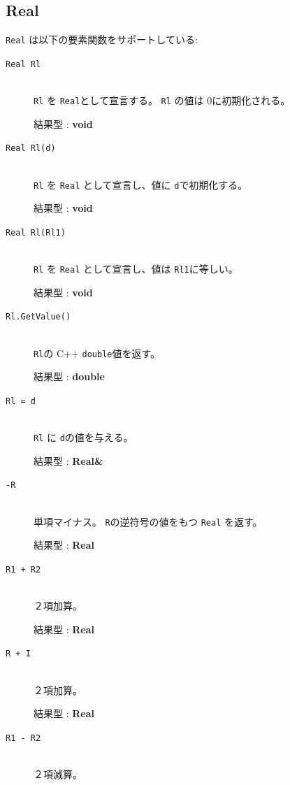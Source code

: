\documentclass[\pformat,12pt]{jarticle}
\begin{document}
\subsection{Real}
{\tt Real} は以下の要素関数をサポートしている:

\vspace{0.5cm}

\begin{description}
\item[{\tt Real Rl}] \mbox{}\\
     {\tt Rl} を {\tt Real}として宣言する。 
{\tt Rl} の値は 0に初期化される。

     結果型 : {\bf void}

\item[{\tt Real Rl(d)}] \mbox{}\\
      {\tt Rl} を {\tt Real} として宣言し、値に {\tt d}で初期化する。

     結果型 : {\bf void}

\item[{\tt Real Rl(Rl1)}] \mbox{}\\
     {\tt Rl} を {\tt Real} として宣言し、値は {\tt Rl1}に等しい。

     結果型 : {\bf void}

\item[{\tt Rl.GetValue()}] \mbox{}\\
      {\tt Rl}の C++ {\tt double}値を返す。

     結果型 : {\bf double}
     
\item[{\tt Rl = d}] \mbox{}\\
      {\tt Rl} に {\tt d}の値を与える。

     結果型 : {\bf Real\&}

\item[{\tt -R}] \mbox{}\\
     単項マイナス。  {\tt R}の逆符号の値をもつ {\tt Real} を返す。

     結果型 : {\bf Real}

\item[{\tt R1 + R2}] \mbox{}\\
     ２項加算。 

     結果型 : {\bf Real}

\item[{\tt R + I}] \mbox{}\\
     ２項加算。

     結果型 : {\bf Real}

\item[{\tt R1 - R2}] \mbox{}\\
     ２項減算。 


\end{description}
\end{document}
